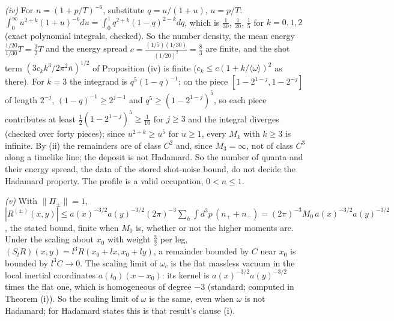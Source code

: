 \emph{(iv)} For $n = (1 + p/T)^{-6}$, substitute $q = u/(1 + u)$, $u = p/T$: $\int_{0}^{\infty}u^{2 + k}(1 + u)^{-6}du = \int_{0}^{1}q^{2 + k}(1 - q)^{2 - k}dq$, which is $\tfrac{1}{30}$, $\tfrac{1}{20}$, $\tfrac15$ for $k = 0, 1, 2$ (exact polynomial integrals, checked). So the number density, the mean energy $\tfrac{1/20}{1/30}T = \tfrac32 T$ and the energy spread $c = \tfrac{(1/5)(1/30)}{(1/20)^{2}} = \tfrac83$ are finite, and the shot term $(3c_{k}k^{3}/2\pi^{2}\bar n)^{1/2}$ of Proposition (iv) is finite ($c_{k} \le c(1 + k/\langle\omega\rangle)^{2}$ as there). For $k = 3$ the integrand is $q^{5}(1 - q)^{-1}$; on the piece $[1 - 2^{1 - j}, 1 - 2^{-j}]$ of length $2^{-j}$, $(1 - q)^{-1} \ge 2^{j - 1}$ and $q^{5} \ge (1 - 2^{1 - j})^{5}$, so each piece contributes at least $\tfrac12(1 - 2^{1-j})^{5} \ge \tfrac{1}{10}$ for $j \ge 3$ and the integral diverges (checked over forty pieces); since $u^{2 + k} \ge u^{5}$ for $u \ge 1$, every $M_{k}$ with $k \ge 3$ is infinite. By (ii) the remainders are of class $C^{2}$ and, since $M_{3} = \infty$, not of class $C^{3}$ along a timelike line; the deposit is not Hadamard. So the number of quanta and their energy spread, the data of the stored shot-noise bound, do not decide the Hadamard property. The profile is a valid occupation, $0 < n \le 1$.

\emph{(v)} With $\|\Pi_{\pm}\| = 1$, $|R^{(\pm)}(x, y)| \le a(x)^{-3/2}a(y)^{-3/2}(2\pi)^{-3}\sum_{h}\int d^{3}p\,(n_{+} + n_{-}) = (2\pi)^{-3}M_{0}\,a(x)^{-3/2}a(y)^{-3/2}$, the stated bound, finite when $M_{0}$ is, whether or not the higher moments are. Under the scaling about $x_{0}$ with weight $\tfrac32$ per leg, $(S_{l}R)(x, y) = l^{3}R(x_{0} + lx, x_{0} + ly)$, a remainder bounded by $C$ near $x_{0}$ is bounded by $l^{3}C \to 0$. The scaling limit of $\omega_{c}$ is the flat massless vacuum in the local inertial coordinates $a(t_{0})(x - x_{0})$: its kernel is $a(x)^{-3/2}a(y)^{-3/2}$ times the flat one, which is homogeneous of degree $-3$ (standard; computed in Theorem (i)). So the scaling limit of $\omega$ is the same, even when $\omega$ is not Hadamard; for Hadamard states this is that result's clause (i).
